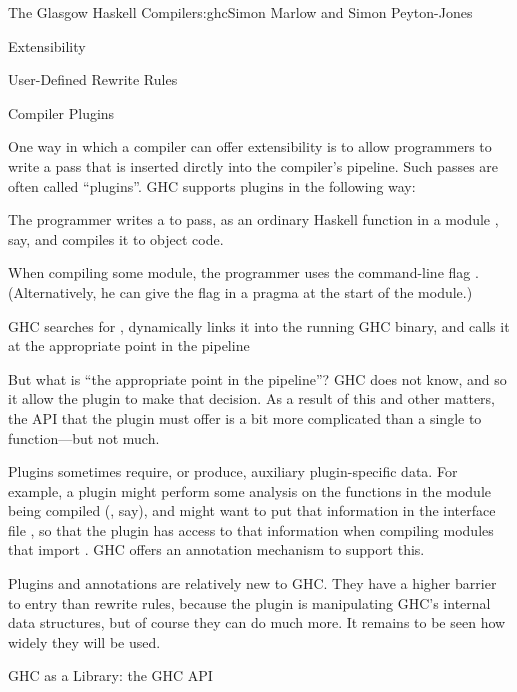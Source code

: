 \begin{aosachapter}{The Glasgow Haskell Compiler}{s:ghc}{Simon Marlow and Simon Peyton-Jones}
\begin{aosasect1}{Extensibility}
\begin{aosasect2}{User-Defined Rewrite Rules}
\end{aosasect2}

\begin{aosasect2}{Compiler Plugins}

One way in which a compiler can offer extensibility is to allow
programmers to write a pass that is inserted dirctly into the
compiler's pipeline.  Such passes are often called ``plugins''.  GHC
supports plugins in the following way:

\begin{aosaitemize}

\item The programmer writes a  to  pass, as an ordinary
  Haskell function in a module , say, and compiles it to
  object code.

\item When compiling some module, the programmer uses the command-line
  flag .  (Alternatively, he can give the flag in a
  pragma at the start of the module.)

\item GHC searches for , dynamically links it into the
  running GHC binary, and calls it at the appropriate point in the
  pipeline

\end{aosaitemize}

But what is ``the appropriate point in the pipeline''?  GHC does not
know, and so it allow the plugin to make that decision.  As a result
of this and other matters, the API that the plugin must offer is a bit
more complicated than a single  to  function---but not
much.

Plugins sometimes require, or produce, auxiliary plugin-specific data.
For example, a plugin might perform some analysis on the functions in
the module being compiled (, say), and might want to put
that information in the interface file , so that the plugin
has access to that information when compiling modules that import
.  GHC offers an annotation mechanism to support this.

Plugins and annotations are relatively new to GHC.  They have a higher
barrier to entry than rewrite rules, because the plugin is
manipulating GHC's internal data structures, but of course they can do
much more.  It remains to be seen how widely they will be used.

\end{aosasect2}

\begin{aosasect2}{GHC as a Library: the GHC API}
\label{s:ghcapi}


\end{aosasect2}
\end{aosasect1}
\end{aosachapter}
